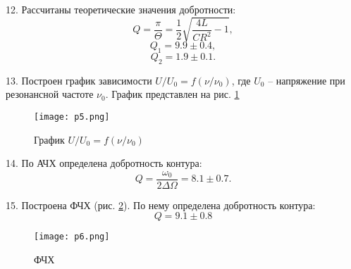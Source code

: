 12. Рассчитаны теоретические значения добротности:
\[Q = \frac{\pi}{\Theta} = \frac 12 \sqrt{\frac{4L}{CR^2} - 1},\]
\[Q_1 = 9.9 \pm 0.4,\]
\[Q_2 = 1.9 \pm 0.1.\]

13. Построен график зависимости $U / U_0 = f (\nu / \nu_0)$, где $U_0$ -- напряжение при резонансной частоте $\nu_0$. График представлен на рис. \ref{pic:p5}

\begin{figure}[h]
    \centering
    \texttt{[image: p5.png]}
    \caption{График $U / U_0 = f (\nu / \nu_0)$}
    \label{pic:p5}
\end{figure}

14. По АЧХ определена добротность контура:
\[Q = \frac{\omega_0}{2\Delta\Omega} = 8.1 \pm 0.7.\]

15. Построена ФЧХ (рис. \ref{pic:p6}). По нему определена добротность контура:
\[Q = 9.1 \pm 0.8\]
\begin{figure}[h]
    \centering
    \texttt{[image: p6.png]}
    \caption{ФЧХ}
    \label{pic:p6}
\end{figure}

